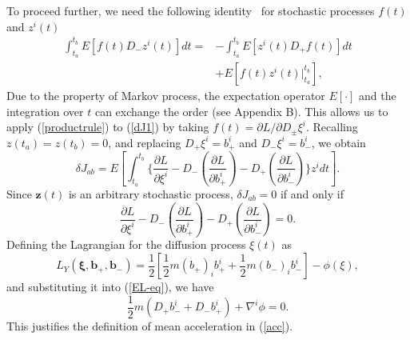 \documentclass[%
 aip, 
 amsmath,amssymb,amsthm,
 nofootinbib,
 reprint,
]{revtex4-1}
\begin{document}
To proceed further, we need the following identity~\cite{Nelsonbook} for stochastic processes $f(t)$ and $z^i(t)$
\begin{equation}
    \label{productrule}
    \begin{split}
        \int_{t_a}^{t_b} E[f(t)D_-z^i(t)]dt =& - \int_{t_a}^{t_b} E[z^i(t)D_+f(t) ]dt \\
        &+ E[f(t)z^i(t)|^{t_b}_{t_a}],
    \end{split}
\end{equation}
Due to the property of Markov process, the expectation operator $E[\cdot]$ and the integration over $t$ can exchange the order (see Appendix B). This allows us to apply (\ref{productrule}) to (\ref{dJ1}) by taking $f(t)=\partial L/\partial D_{\pm}\xi^i$. Recalling $z(t_a)=z(t_b)=0$, and replacing $D_+\xi^i=b^i_+$ and $D_-\xi^i=b^i_-$, we obtain
\begin{equation}
\label{dJ3}
    \delta J_{ab}=E[\int_{t_a}^{t_b}\{\frac{\partial L}{\partial \xi^i} - D_-( \frac{\partial L}{\partial b^i_+}) - D_+(\frac{\partial L}{\partial b_-^i})\}z^idt].
\end{equation}
Since $\mathbf{z}(t)$ is an arbitrary stochastic process, $\delta J_{ab}=0$ if and only if 
\begin{equation}
    \label{EL-eq}
    \frac{\partial L}{\partial \xi^i} - D_-( \frac{\partial L}{\partial b^i_+}) - D_+(\frac{\partial L}{\partial b_-^i}) =0.
\end{equation}
Defining the Lagrangian for the diffusion process $\xi(t)$ as
\begin{equation}
    \label{L_Y}
    L_Y(\mathbf{\xi, b_+, b_-}) = \frac{1}{2}[\frac{1}{2}m(b_+)_ib_+^i + \frac{1}{2}m(b_-)_ib_-^i] - \phi(\xi),
\end{equation}
and substituting it into (\ref{EL-eq}), we have
\begin{equation}
\label{YasueEq}
    \frac{1}{2}m(D_+b_-^i + D_-b_+^i) + \nabla^i\phi = 0.
\end{equation}
This justifies the definition of mean acceleration in (\ref{acc}).
\end{document}

